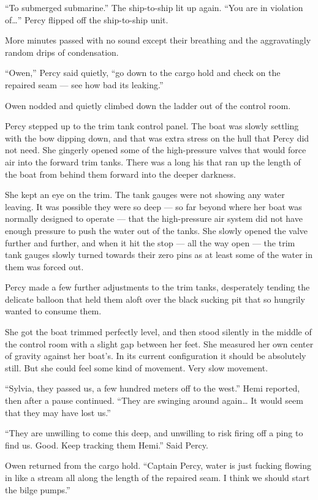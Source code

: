 \documentclass[
]{scrbook}
\begin{document}
``To submerged submarine.'' The ship-to-ship lit up again. ``You are in
violation of\ldots{}'' Percy flipped off the ship-to-ship unit.

More minutes passed with no sound except their breathing and the
aggravatingly random drips of condensation.

``Owen,'' Percy said quietly, ``go down to the cargo hold and check on
the repaired seam --- see how bad its leaking.''

Owen nodded and quietly climbed down the ladder out of the control room.

Percy stepped up to the trim tank control panel. The boat was slowly
settling with the bow dipping down, and that was extra stress on the
hull that Percy did not need. She gingerly opened some of the
high-pressure valves that would force air into the forward trim tanks.
There was a long his that ran up the length of the boat from behind them
forward into the deeper darkness.

She kept an eye on the trim. The tank gauges were not showing any water
leaving. It was possible they were so deep --- so far beyond where her
boat was normally designed to operate --- that the high-pressure air
system did not have enough pressure to push the water out of the tanks.
She slowly opened the valve further and further, and when it hit the
stop --- all the way open --- the trim tank gauges slowly turned towards
their zero pins as at least some of the water in them was forced out.

Percy made a few further adjustments to the trim tanks, desperately
tending the delicate balloon that held them aloft over the black sucking
pit that so hungrily wanted to consume them.

She got the boat trimmed perfectly level, and then stood silently in the
middle of the control room with a slight gap between her feet. She
measured her own center of gravity against her boat's. In its current
configuration it should be absolutely still. But she could feel some
kind of movement. Very slow movement.

``Sylvia, they passed us, a few hundred meters off to the west.'' Hemi
reported, then after a pause continued. ``They are swinging around
again\ldots{} It would seem that they may have lost us.''

``They are unwilling to come this deep, and unwilling to risk firing off
a ping to find us. Good. Keep tracking them Hemi.'' Said Percy.

Owen returned from the cargo hold. ``Captain Percy, water is just
fucking flowing in like a stream all along the length of the repaired
seam. I think we should start the bilge pumps.''
\end{document}
